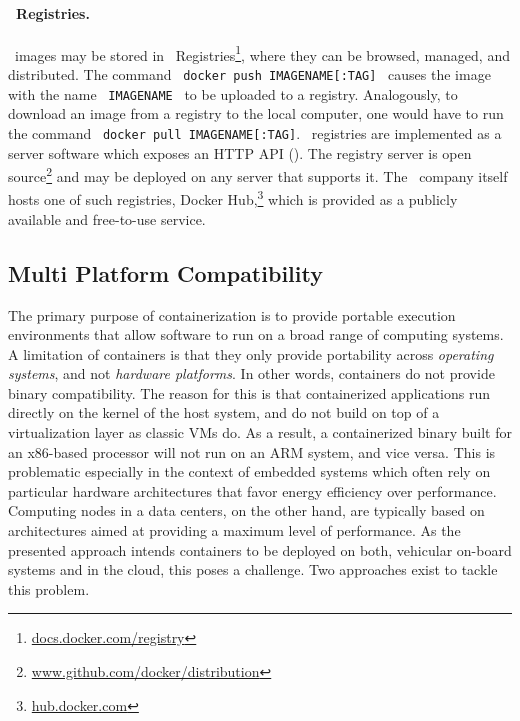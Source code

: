 \paragraph{\docker\ Registries.}
\docker\ images may be stored in \docker\ Registries\footnote{\url{docs.docker.com/registry}}, where they can be browsed, managed, and distributed. The command \ \mbox{\texttt{docker push IMAGENAME[:TAG]}} \ causes the image with the name \ \mbox{\texttt{IMAGENAME}} \ to be uploaded to a registry. Analogously, to download an image from a registry to the local computer, one would have to run the command \ \mbox{\texttt{docker pull IMAGENAME[:TAG]}}. \docker\ registries are implemented as a server software which exposes an HTTP API (\cf {}). The registry server is open source\footnote{\url{www.github.com/docker/distribution}} and may be deployed on any server that supports it. The \docker\ company itself hosts one of such registries, Docker Hub,\footnote{\url{hub.docker.com}} which is provided as a publicly available  and free-to-use service.

\subsection{Multi Platform Compatibility} \label{sec:multiplat}
The primary purpose of containerization is to provide portable execution environments that allow software to run on a broad range of computing systems. A limitation of containers is that they only provide portability across \emph{operating systems}, and not \emph{hardware platforms}. In other words, containers do not provide binary compatibility. The reason for this is that containerized applications run directly on the kernel of the host system, and do not build on top of a virtualization layer as classic VMs do. As a result, a containerized binary built for an x86-based processor will not run on an ARM system, and vice versa. This is problematic especially in the context of embedded systems which often rely on particular hardware architectures that favor energy efficiency over performance. Computing nodes in a data centers, on the other hand, are typically based on architectures aimed at providing a maximum level of performance. As the presented approach intends containers to be deployed on both, vehicular on-board systems and in the cloud, this poses a challenge. Two approaches exist to tackle this problem.

